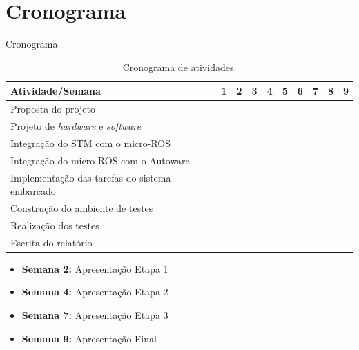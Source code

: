 \documentclass{if-beamer}
\begin{document}
\section{Cronograma}

\begin{frame}{Cronograma}
	
	
\begin{table}
	\centering
	\small{
		\begin{tabular}{|b|b|b|b|b|b|b|b|b|b|}
			\hline
			\textbf{Atividade/Semana} & 1 \cellcolor{lightgray} & \textbf{2} \cellcolor{lightgray} & 3 \cellcolor{lightgray} & \textbf{4} \cellcolor{lightgray} & 5 \cellcolor{lightgray} & 6 \cellcolor{lightgray} & \textbf{7} & 8 & \textbf{9} \\
			\hline
			Proposta do projeto  & \cellcolor{unifeiblue} &  &  &  &  &  &  &  &  \\
			\hline
			Projeto de \textit{hardware} e \textit{software}  &  & \cellcolor{unifeiblue} & \cellcolor{unifeiblue} &  &  &  &  &  &  \\
			\hline
			Integração do STM com o micro-ROS  &  & \cellcolor{unifeiblue} &  &  &  &  &  &  &  \\
			\hline
			Integração do micro-ROS com o Autoware  &  &  & \cellcolor{unifeiblue} & \cellcolor{unifeiblue} & \cellcolor{unifeiblue} &  &  &  &  \\
			\hline
			Implementação das tarefas do sistema embarcado  &  &  &  & \cellcolor{unifeiblue} & \cellcolor{unifeiblue} & \cellcolor{unifeiblue} & \cellcolor{unifeiblue} &  &  \\
			\hline
			Construção do ambiente de testes  &  &  &  &  & \cellcolor{unifeiblue} & \cellcolor{unifeiblue} & \cellcolor{unifeiblue} &  &  \\
			\hline
			Realização dos testes  &  &  &  &  &  &  & \cellcolor{unifeiblue} & \cellcolor{unifeiblue} & \cellcolor{unifeiblue} \\
			\hline
			Escrita do relatório  &   & \cellcolor{unifeiblue} & \cellcolor{unifeiblue} & \cellcolor{unifeiblue} & \cellcolor{unifeiblue} & \cellcolor{unifeiblue} & \cellcolor{unifeiblue} & \cellcolor{unifeiblue} & \cellcolor{unifeiblue} \\
			\hline
		\end{tabular}
	}
	\caption{Cronograma de atividades.}
	\label{tab:crono}
\end{table}
	
	\begin{itemize}
		\small
		\item {\color{gray}\textbf{Semana 2:} Apresentação Etapa 1}
		\item {\color{gray}\textbf{Semana 4:} Apresentação Etapa 2}
		\item \textbf{Semana 7:} Apresentação Etapa 3
		\item \textbf{Semana 9:} Apresentação Final
	\end{itemize}
	
\end{frame}
\end{document}
